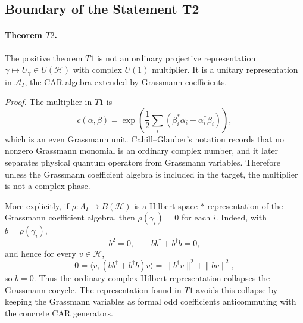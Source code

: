 \subsection{Boundary of the Statement T2}

\paragraph{Theorem \(T2\).}
The positive theorem \(T1\) is not an ordinary projective representation
\(\gamma\mapsto U_\gamma\in U(\mathcal H)\) with complex \(U(1)\) multiplier.
It is a unitary representation in \(\mathcal A_I\), the CAR algebra extended by
Grassmann coefficients.

\emph{Proof.}
The multiplier in \(T1\) is
\[
  c(\alpha,\beta)=
  \exp\!\left(\frac12\sum_i(\beta_i^*\alpha_i-\alpha_i^*\beta_i)\right),
\]
which is an even Grassmann unit.  Cahill--Glauber's notation records that no
nonzero Grassmann monomial is an ordinary complex number, and it later
separates physical quantum operators from Grassmann variables.  Therefore
unless the Grassmann coefficient algebra is included in the target, the
multiplier is not a complex phase.

More explicitly, if \(\rho:\Lambda_I\to B(\mathcal H)\) is a Hilbert-space
\(*\)-representation of the Grassmann coefficient algebra, then
\(\rho(\gamma_i)=0\) for each \(i\).  Indeed, with \(b=\rho(\gamma_i)\),
\[
  b^2=0,\qquad bb^\dagger+b^\dagger b=0,
\]
and hence for every \(v\in\mathcal H\),
\[
  0=\langle v,(bb^\dagger+b^\dagger b)v\rangle
   =\|b^\dagger v\|^2+\|bv\|^2,
\]
so \(b=0\).  Thus the ordinary complex Hilbert representation collapses the
Grassmann cocycle.  The representation found in \(T1\) avoids this collapse by
keeping the Grassmann variables as formal odd coefficients anticommuting with
the concrete CAR generators.

